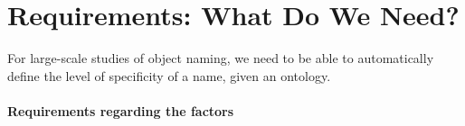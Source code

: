 
\section{Requirements: What Do We Need? }
For large-scale studies of object naming, we need to be able to automatically define the level of specificity of a name, given an ontology. 

\paragraph{Requirements regarding the factors}

